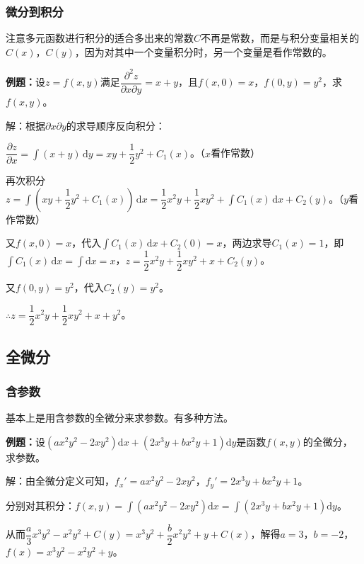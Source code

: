 \documentclass[UTF8, 12pt]{ctexart}
\begin{document}
\subsubsection{微分到积分}

注意多元函数进行积分的适合多出来的常数$C$不再是常数，而是与积分变量相关的$C(x)$，$C(y)$，因为对其中一个变量积分时，另一个变量是看作常数的。

\textbf{例题：}设$z=f(x,y)$满足$\dfrac{\partial^2z}{\partial x\partial y}=x+y$，且$f(x,0)=x$，$f(0,y)=y^2$，求$f(x,y)$。

解：根据$\partial x\partial y$的求导顺序反向积分：

$\dfrac{\partial z}{\partial x}=\int(x+y)\,\textrm{d}y=xy+\dfrac{1}{2}y^2+C_1(x)$。（$x$看作常数）

再次积分$z=\displaystyle{\int\left(xy+\dfrac{1}{2}y^2+C_1(x)\right)\,\textrm{d}x}=\dfrac{1}{2}x^2y+\dfrac{1}{2}xy^2+\int C_1(x)\,\textrm{d}x+C_2(y)$。（$y$看作常数）

又$f(x,0)=x$，代入$\int C_1(x)\,\textrm{d}x+C_2(0)=x$，两边求导$C_1(x)=1$，即$\int C_1(x)\,\textrm{d}x=\int\textrm{d}x=x$，$z=\dfrac{1}{2}x^2y+\dfrac{1}{2}xy^2+x+C_2(y)$。

又$f(0,y)=y^2$，代入$C_2(y)=y^2$。

$\therefore z=\dfrac{1}{2}x^2y+\dfrac{1}{2}xy^2+x+y^2$。


\subsection{全微分}

\subsubsection{含参数}

基本上是用含参数的全微分来求参数。有多种方法。

\textbf{例题：}设$(ax^2y^2-2xy^2)\textrm{d}x+(2x^3y+bx^2y+1)\textrm{d}y$是函数$f(x,y)$的全微分，求参数。

解：由全微分定义可知，$f_x'=ax^2y^2-2xy^2$，$f_y'=2x^3y+bx^2y+1$。

分别对其积分：$f(x,y)=\int(ax^2y^2-2xy^2)\textrm{d}x=\int(2x^3y+bx^2y+1)\textrm{d}y$。

从而$\dfrac{a}{3}x^3y^2-x^2y^2+C(y)=x^3y^2+\dfrac{b}{2}x^2y^2+y+C(x)$，解得$a=3$，$b=-2$，$f(x)=x^3y^2-x^2y^2+y$。
\end{document}
